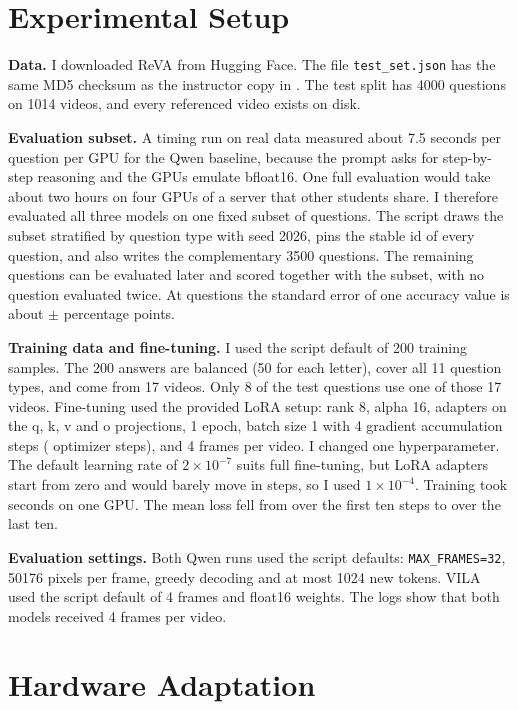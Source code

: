 \documentclass[11pt]{article}
\begin{document}
\section{Experimental Setup}

\textbf{Data.} I downloaded ReVA from Hugging Face. The file \texttt{test\_set.json} has the same MD5 checksum as the instructor copy in . The test split has 4000 questions on 1014 videos, and every referenced video exists on disk.

\textbf{Evaluation subset.} A timing run on real data measured about 7.5 seconds per question per GPU for the Qwen baseline, because the prompt asks for step-by-step reasoning and the GPUs emulate bfloat16. One full evaluation would take about two hours on four GPUs of a server that other students share. I therefore evaluated all three models on one fixed subset of \NQ{} questions. The script  draws the subset stratified by question type with seed 2026, pins the stable id of every question, and also writes the complementary 3500 questions. The remaining questions can be evaluated later and scored together with the subset, with no question evaluated twice. At \NQ{} questions the standard error of one accuracy value is about $\pm$\StdErr{} percentage points.

\textbf{Training data and fine-tuning.} I used the script default of 200 training samples. The 200 answers are balanced (50 for each letter), cover all 11 question types, and come from 17 videos. Only 8 of the \NQ{} test questions use one of those 17 videos. Fine-tuning used the provided LoRA setup: rank 8, alpha 16, adapters on the q, k, v and o projections, 1 epoch, batch size 1 with 4 gradient accumulation steps (\TrainSteps{} optimizer steps), and 4 frames per video. I changed one hyperparameter. The default learning rate of $2\times10^{-7}$ suits full fine-tuning, but LoRA adapters start from zero and would barely move in \TrainSteps{} steps, so I used $1\times10^{-4}$. Training took \TrainSeconds{} seconds on one GPU. The mean loss fell from \LossFirstTen{} over the first ten steps to \LossLastTen{} over the last ten.

\textbf{Evaluation settings.} Both Qwen runs used the script defaults: \texttt{MAX\_FRAMES=32}, 50176 pixels per frame, greedy decoding and at most 1024 new tokens. VILA used the script default of 4 frames and float16 weights. The logs show that both models received 4 frames per video.

\section{Hardware Adaptation}
\end{document}
